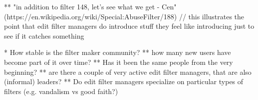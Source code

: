   ** "in addition to filter 148, let's see what we get - Cen" (https://en.wikipedia.org/wiki/Special:AbuseFilter/188) // this illustrates the point that edit filter managers do introduce stuff they feel like introducing just to see if it catches something

* How stable is the filter maker community?
  ** how many new users have become part of it over time?
  ** Has it been the same people from the very beginning?
  ** are there a couple of very active edit filter managers, that are also (informal) leaders?
  ** Do edit filter managers specialize on particular types of filters (e.g. vandalism vs good faith?)

